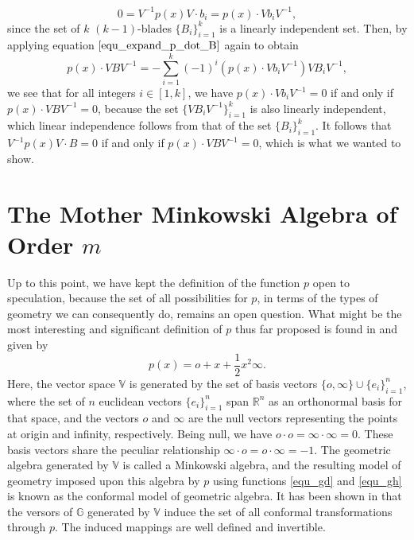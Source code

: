 \documentclass{ecgd-l}
\numberwithin{equation}{section}
\newcommand{\R}{\mathbb{R}}
\newcommand{\G}{\mathbb{G}}
\newcommand{\V}{\mathbb{V}}
\newcommand{\nvai}{\infty}
\newcommand{\nvao}{o}
\begin{document}
\begin{equation*}
0=V^{-1}p(x)V\cdot b_i=p(x)\cdot Vb_iV^{-1},
\end{equation*}
since the set of $k$ $(k-1)$-blades $\{B_i\}_{i=1}^k$ is a linearly
independent set.  Then, by applying equation $\eqref{equ_expand_p_dot_B}$ again
to obtain
\begin{equation*}
p(x)\cdot VBV^{-1} = -\sum_{i=1}^k(-1)^i(p(x)\cdot Vb_iV^{-1})VB_iV^{-1},
\end{equation*}
we see that
for all integers $i\in[1,k]$, we have $p(x)\cdot Vb_iV^{-1}=0$
if and only if $p(x)\cdot VBV^{-1}=0$, because the set $\{VB_iV^{-1}\}_{i=1}^k$ is
also linearly independent, which linear independence follows from that of the
set $\{B_i\}_{i=1}^k$.
It follows that $V^{-1}p(x)V\cdot B=0$ if and only if $p(x)\cdot VBV^{-1}=0$,
which is what we wanted to show.

\section{The Mother Minkowski Algebra of Order $m$}

Up to this point, we have kept the definition of the function $p$
open to speculation, because the set of all possibilities for $p$, in terms of the types of geometry
we can consequently do, remains an open question.  What might be the most interesting and significant
definition of $p$ thus far proposed is found in \cite{Hestenes01} and given by
\begin{equation*}
p(x)=\nvao + x + \frac{1}{2}x^2\nvai.
\end{equation*}
Here, the vector space $\V$ is generated by the set
of basis vectors $\{\nvao,\nvai\}\cup\{e_i\}_{i=1}^n$,
where the set of $n$ euclidean vectors $\{e_i\}_{i=1}^n$ span
$\R^n$ as an orthonormal basis for that space, and the
vectors $\nvao$ and $\nvai$ are the null vectors representing the
points at origin and infinity, respectively.  Being null, we have $\nvao\cdot\nvao=\nvai\cdot\nvai=0$.
These basis vectors share the peculiar relationship $\nvai\cdot\nvao=\nvao\cdot\nvai=-1$.  The geometric
algebra generated by $\V$ is called a Minkowski algebra, and the resulting model of
geometry imposed upon this algebra by $p$ using functions \eqref{equ_gd} and \eqref{equ_gh}
is known as the conformal model of geometric algebra.  It has been shown in
\cite{Hestenes01,LiRockwood01,Dorst07} that
the versors of $\G$ generated by $\V$ induce the set of all conformal transformations through $p$.
The induced mappings are well defined and invertible.
\end{document}
